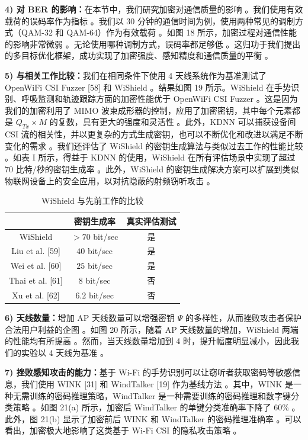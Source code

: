 \documentclass[journal]{IEEEtran}
\begin{document}
\textbf{4) 对 BER 的影响：}在本节中，我们研究加密对通信质量的影响 。我们使用有效载荷的误码率作为指标 。我们以 30 分钟的通信时间为例，使用两种常见的调制方式（QAM-32 和 QAM-64）作为有效载荷 。如图 18 所示，加密过程对通信性能的影响非常微弱 。无论使用哪种调制方式，误码率都足够低 。这归功于我们提出的多目标优化框架，成功实现了加密强度、感知精度和通信质量的平衡 。

\textbf{5) 与相关工作比较：}我们在相同条件下使用 4 天线系统作为基准测试了 OpenWiFi CSI Fuzzer [58] 和 WiShield 。结果如图 19 所示。WiShield 在手势识别、呼吸监测和轨迹跟踪方面的加密性能优于 OpenWiFi CSI Fuzzer 。这是因为我们的加密利用了 MIMO 波束成形器的控制，应用了加密密钥，其中每个元素都是 $Q_{Tx}\times M$ 的复数，具有更大的强度和灵活性 。此外，KDNN 可以捕获设备间 CSI 流的相关性，并以更复杂的方式生成密钥，也可以不断优化和改进以满足不断变化的需求 。我们还评估了 WiShield 的密钥生成算法与类似过去工作的性能比较 。如表 I 所示，得益于 KDNN 的使用，WiShield 在所有评估场景中实现了超过 70 比特/秒的密钥生成率 。此外，WiShield 的密钥生成解决方案可以扩展到类似物联网设备上的安全应用，以对抗隐蔽的射频窃听攻击 。

\begin{table}[htbp]
\caption{WiShield 与先前工作的比较 }
\begin{center}
\begin{tabular}{ccc}
\toprule
& 密钥生成率 & 真实评估测试 \\
\midrule
WiShield & $>70$ bit/sec & 是 \\
Liu et al. [59] & $40$ bit/sec & 是 \\
Wei et al. [60] & $25$ bit/sec & 是 \\
Thai et al. [61] & $8$ bit/sec & 否 \\
Xu et al. [62] & $6.2$ bit/sec & 否 \\
\bottomrule
\end{tabular}
\end{center}
\label{tab:comparison}
\end{table}

\textbf{6) 天线数量：}增加 AP 天线数量可以增强密钥 $\Psi$ 的多样性，从而挫败攻击者保护合法用户利益的企图 。如图 20 所示，随着 AP 天线数量的增加，WiShield 两端的性能均有所提高 。然而，当天线数量增加到 4 时，提升幅度明显减小，因此我们的实验以 4 天线为基准 。

\textbf{7) 挫败感知攻击的能力：}基于 Wi-Fi 的手势识别可以让窃听者获取密码等敏感信息，我们使用 WINK [31] 和 WindTalker [19] 作为基线方法 。其中，WINK 是一种无需训练的密码推理策略，WindTalker 是一种需要训练的密码推理和数字键分类策略 。如图 21(a) 所示，加密后 WindTalker 的单键分类准确率下降了 60\% 。此外，图 21(b) 显示了加密前后 WINK 和 WindTalker 的密码推理准确率 。可以看出，加密极大地影响了这类基于 Wi-Fi CSI 的隐私攻击策略 。
\end{document}

